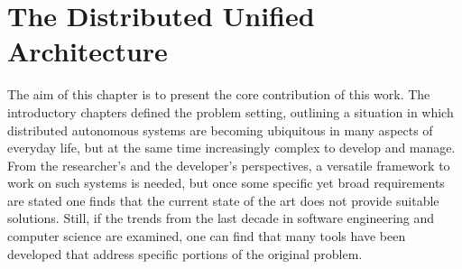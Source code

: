 \chapter{The Distributed Unified Architecture}
\label{ch:dua}
\doublespacing
\vspace{-2.5cm}

The aim of this chapter is to present the core contribution of this work. The introductory chapters defined the problem setting, outlining a situation in which distributed autonomous systems are becoming ubiquitous in many aspects of everyday life, but at the same time increasingly complex to develop and manage. From the researcher's and the developer's perspectives, a versatile framework to work on such systems is needed, but once some specific yet broad requirements are stated one finds that the current state of the art does not provide suitable solutions. Still, if the trends from the last decade in software engineering and computer science are examined, one can find that many tools have been developed that address specific portions of the original problem.

